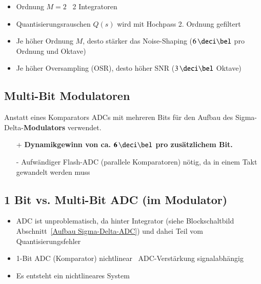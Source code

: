 \begin{itemize}
    \item Ordnung $M = 2$ \textrightarrow\ 2 Integratoren
    \item Quantisierungsrauschen $Q(s)$ wird mit Hochpass 2. Ordnung gefiltert
    \item Je höher Ordnung $M$, desto stärker das Noise-Shaping ($6 \, \deci \bel$ pro Ordnung und Oktave)
    \item Je höher Oversampling (OSR), desto höher SNR ($3 \, \deci \bel$ Oktave)
\end{itemize}


\subsection{Multi-Bit Modulatoren}

Anstatt eines Komparators ADCs mit mehreren Bits für den Aufbau des Sigma-Delta-\textbf{Modulators} verwendet.

\begin{minipage}[t]{0.48\columnwidth}
    \begin{itemize}
        \item[+] \textbf{Dynamikgewinn von ca. $\bm{6 \, \deci \bel }$ pro zusätzlichem Bit.}
    \end{itemize}
\end{minipage}
\hfill
\begin{minipage}[t]{0.48\columnwidth}
    \begin{itemize}
        \item[-] Aufwändiger Flash-ADC (parallele Komparatoren) nötig, da in einem Takt gewandelt werden muss
    \end{itemize}
\end{minipage}


\subsection{1 Bit vs. Multi-Bit ADC (im Modulator)}

\begin{itemize}
    \item ADC ist unproblematisch, da hinter Integrator (siehe Blockschaltbild Abschnitt~\ref{Aufbau Sigma-Delta-ADC}) und dahei 
        Teil vom Quantisierungsfehler
    \item 1-Bit ADC (Komparator) nichtlinear \textrightarrow\ ADC-Verstärkung signalabhängig
    \item Es entsteht ein nichtlineares System
\end{itemize}


